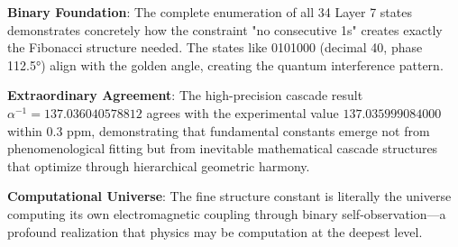 \documentclass[%
 reprint,
 amsmath,amssymb,
 aps,
 prd,
 10pt,
 nofootinbib,      %
 longbibliography  %
]{revtex4-2}
\theoremstyle{definition}
\theoremstyle{remark}
\begin{document}
\textbf{Binary Foundation}: The complete enumeration of all 34 Layer 7 states demonstrates
concretely how the constraint "no consecutive 1s" creates exactly the Fibonacci structure
needed. The states like 0101000 (decimal 40, phase 112.5°) align with the golden angle,
creating the quantum interference pattern.

\textbf{Extraordinary Agreement}: The high-precision cascade result $\alpha^{-1} = 137.036040578812$ 
agrees with the experimental value $137.035999084000$ within 0.3 ppm, demonstrating that 
fundamental constants emerge not from phenomenological fitting but from inevitable 
mathematical cascade structures that optimize through hierarchical geometric harmony.

\textbf{Computational Universe}: The fine structure constant is literally the universe
computing its own electromagnetic coupling through binary self-observation—a profound
realization that physics may be computation at the deepest level.
\end{document}
